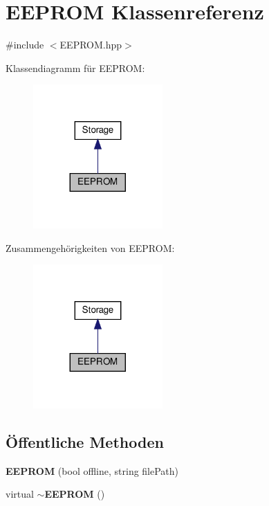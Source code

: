 \section{E\+E\+P\+R\+OM Klassenreferenz}
\label{class_e_e_p_r_o_m}


{\ttfamily \#include $<$E\+E\+P\+R\+O\+M.\+hpp$>$}



Klassendiagramm für E\+E\+P\+R\+OM\+:\nopagebreak
\begin{figure}[H]
\begin{center}
\leavevmode
\includegraphics[width=140pt]{class_e_e_p_r_o_m__inherit__graph}
\end{center}
\end{figure}


Zusammengehörigkeiten von E\+E\+P\+R\+OM\+:\nopagebreak
\begin{figure}[H]
\begin{center}
\leavevmode
\includegraphics[width=140pt]{class_e_e_p_r_o_m__coll__graph}
\end{center}
\end{figure}
\subsection*{Öffentliche Methoden}
\begin{DoxyCompactItemize}
\item 
\textbf{ E\+E\+P\+R\+OM} (bool offline, string file\+Path)
\item 
virtual \textbf{ $\sim$\+E\+E\+P\+R\+OM} ()
\end{DoxyCompactItemize}
